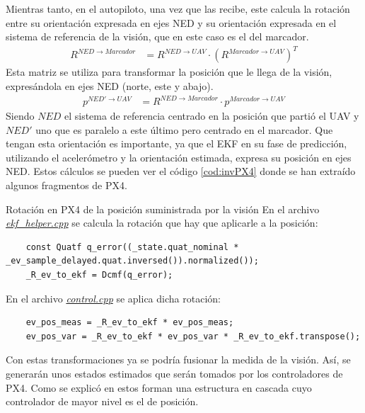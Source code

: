 Mientras tanto, en el autopiloto, una vez que las recibe, este calcula la rotación entre su orientación expresada en ejes NED y su orientación expresada en el sistema de referencia de la visión, que en este caso es el del marcador. 
\begin{align}
R^{NED \rightarrow Marcador}& =  R^{NED \rightarrow UAV} \cdot  \left(R^{Marcador \rightarrow UAV}\right)^T
\end{align}
Esta matriz se utiliza para transformar la posición que le llega de la visión, expresándola en ejes NED (norte, este y abajo).
\begin{align}
p^{NED' \rightarrow UAV}& = R^{NED \rightarrow Marcador} \cdot p^{Marcador \rightarrow UAV}
\end{align}
Siendo $NED$ el sistema de referencia centrado en la posición que partió el UAV y $NED'$ uno que es paralelo a este último pero centrado en el marcador.
Que tengan esta orientación es importante, ya que el EKF en su fase de predicción, utilizando el acelerómetro y la orientación estimada, expresa su posición en ejes NED.
Estos cálculos se pueden ver el código \ref{cod:invPX4} donde se han extraído algunos fragmentos de PX4. 

\begin{codigo}[label=cod:invPX4]{Rotación en PX4 de la posición suministrada por la visión}
En el archivo \href{https://github.com/PX4/PX4-ECL/blob/ec934908900b23ee273d1a9f82364b7b38423200/EKF/ekf\_helper.cpp\#L1460}{\textit{ekf\_helper.cpp}} se calcula la rotación que hay que aplicarle a la posición:
\begin{verbatim}
    const Quatf q_error((_state.quat_nominal * _ev_sample_delayed.quat.inversed()).normalized());
    _R_ev_to_ekf = Dcmf(q_error);
\end{verbatim}
En el archivo \href{https://github.com/PX4/PX4-ECL/blob/ec934908900b23ee273d1a9f82364b7b38423200/EKF/control.cpp\#L273}{\textit{control.cpp}} se aplica dicha rotación:
\begin{verbatim}
    ev_pos_meas = _R_ev_to_ekf * ev_pos_meas;
    ev_pos_var = _R_ev_to_ekf * ev_pos_var * _R_ev_to_ekf.transpose();
\end{verbatim}
\end{codigo} 

Con estas transformaciones ya se podría fusionar la medida de la visión. Así, se generarán unos estados estimados que serán tomados por los controladores de PX4. Como se explicó en \cite{arias2019control} estos forman una estructura en cascada cuyo controlador de mayor nivel es el de posición. 


